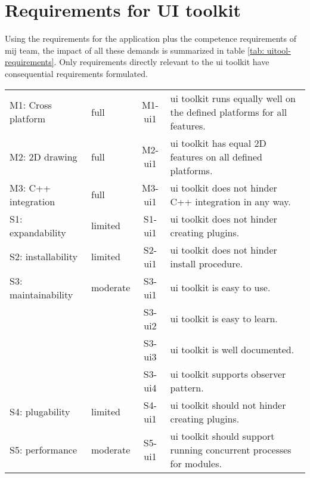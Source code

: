 

\section{Requirements for UI toolkit}

Using the requirements for the application plus the competence requirements of mij team, the impact of
all these demands is summarized in table \ref{tab: uitool-requirements}. Only requirements directly relevant
to the ui toolkit have consequential requirements formulated.

\begin{center}
    \begin{supertabular}{ll||cp{13em}}
	\hline
        M1: Cross platform        & full         & M1-ui1   & ui toolkit runs equally well on the defined platforms for all features.\\
        M2: 2D drawing            & full         & M2-ui1   & ui toolkit has equal 2D features on all defined platforms.\\
        M3: C++ integration       & full         & M3-ui1   & ui toolkit does not hinder C++ integration in any way.\\
        S1: expandability         & limited      & S1-ui1   & ui toolkit does not hinder creating plugins.\\
        S2: installability        & limited      & S2-ui1   & ui toolkit does not hinder install procedure.\\
        S3: maintainability       & moderate     & S3-ui1   & ui toolkit is easy to use.\\
	                          &              & S3-ui2   & ui toolkit is easy to learn.\\
	                          &              & S3-ui3   & ui toolkit is well documented.\\
	                          &              & S3-ui4   & ui toolkit supports observer pattern.\\
        S4: plugability           & limited      & S4-ui1   & ui toolkit should not hinder creating plugins.\\
        S5: performance	          & moderate     & S5-ui1   & ui toolkit should support running concurrent processes for modules.\\

\end{supertabular}
\end{center}
